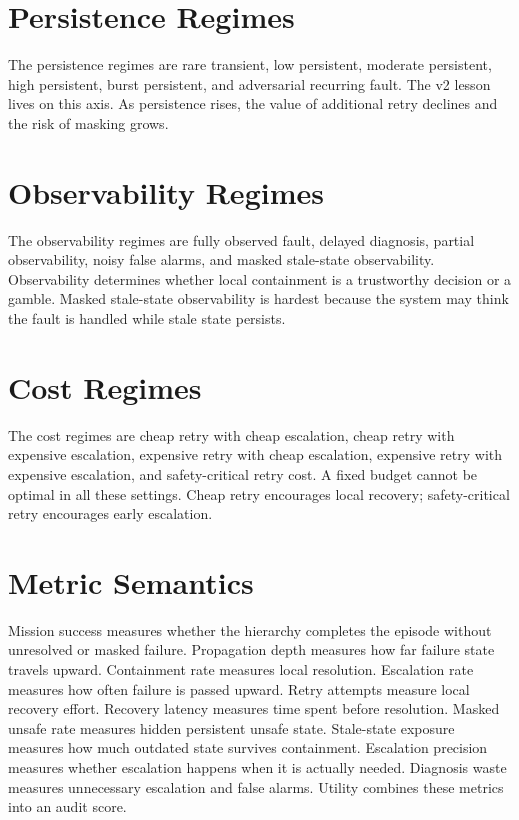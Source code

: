\documentclass{article}
\begin{document}
\section{Persistence Regimes}

The persistence regimes are rare transient, low persistent, moderate persistent, high persistent, burst persistent, and adversarial recurring fault. The v2 lesson lives on this axis. As persistence rises, the value of additional retry declines and the risk of masking grows.

\section{Observability Regimes}

The observability regimes are fully observed fault, delayed diagnosis, partial observability, noisy false alarms, and masked stale-state observability. Observability determines whether local containment is a trustworthy decision or a gamble. Masked stale-state observability is hardest because the system may think the fault is handled while stale state persists.

\section{Cost Regimes}

The cost regimes are cheap retry with cheap escalation, cheap retry with expensive escalation, expensive retry with cheap escalation, expensive retry with expensive escalation, and safety-critical retry cost. A fixed budget cannot be optimal in all these settings. Cheap retry encourages local recovery; safety-critical retry encourages early escalation.

\section{Metric Semantics}

Mission success measures whether the hierarchy completes the episode without unresolved or masked failure. Propagation depth measures how far failure state travels upward. Containment rate measures local resolution. Escalation rate measures how often failure is passed upward. Retry attempts measure local recovery effort. Recovery latency measures time spent before resolution. Masked unsafe rate measures hidden persistent unsafe state. Stale-state exposure measures how much outdated state survives containment. Escalation precision measures whether escalation happens when it is actually needed. Diagnosis waste measures unnecessary escalation and false alarms. Utility combines these metrics into an audit score.
\end{document}
